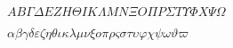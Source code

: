 \documentclass{article}
\begin{document}
$ΑΒΓΔΕΖΗΘΙΚΛΜΝΞΟΠΡΣΤΥΦΧΨΩ$

$αβγδεζηθικλμνξοπρςστυφχψωϑϖ$ %
\end{document}
